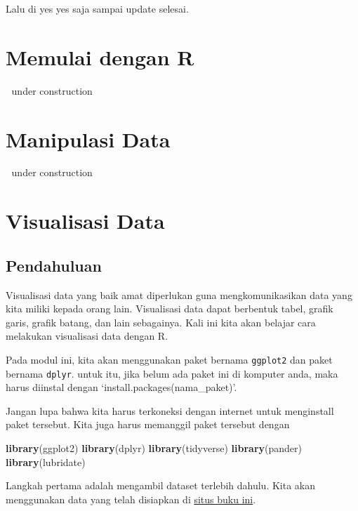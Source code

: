 \documentclass[
]{book}
\newenvironment{Shaded}{\begin{snugshade}}{\end{snugshade}}
\newcommand{\KeywordTok}[1]{\textcolor[rgb]{0.13,0.29,0.53}{\textbf{#1}}}
\newcommand{\NormalTok}[1]{#1}
\begin{document}
Lalu di yes yes saja sampai update selesai.

\hypertarget{intro}{%
\chapter{Memulai dengan R}\label{intro}}

🚧 under construction 🚧

\hypertarget{manipulasi-data}{%
\chapter{Manipulasi Data}\label{manipulasi-data}}

🚧 under construction 🚧

\hypertarget{visualisasi-data}{%
\chapter{Visualisasi Data}\label{visualisasi-data}}

\hypertarget{pendahuluan}{%
\section{Pendahuluan}\label{pendahuluan}}

Visualisasi data yang baik amat diperlukan guna mengkomunikasikan data yang kita miliki kepada orang lain. Visualisasi data dapat berbentuk tabel, grafik garis, grafik batang, dan lain sebagainya. Kali ini kita akan belajar cara melakukan visualisasi data dengan R.

Pada modul ini, kita akan menggunakan paket bernama \texttt{ggplot2} dan paket bernama \texttt{dplyr}. untuk itu, jika belum ada paket ini di komputer anda, maka harus diinstal dengan `install.packages(nama\_paket)'.

Jangan lupa bahwa kita harus terkoneksi dengan internet untuk menginstall paket tersebut. Kita juga harus memanggil paket tersebut dengan

\begin{Shaded}
\begin{Highlighting}[]
\KeywordTok{library}\NormalTok{(ggplot2)}
\KeywordTok{library}\NormalTok{(dplyr)}
\KeywordTok{library}\NormalTok{(tidyverse)}
\KeywordTok{library}\NormalTok{(pander)}
\KeywordTok{library}\NormalTok{(lubridate)}
\end{Highlighting}
\end{Shaded}

Langkah pertama adalah mengambil dataset terlebih dahulu. Kita akan menggunakan data yang telah disiapkan di \href{https://imedkrisna.github.io/r/docs/index.html}{situs buku ini}.
\end{document}

